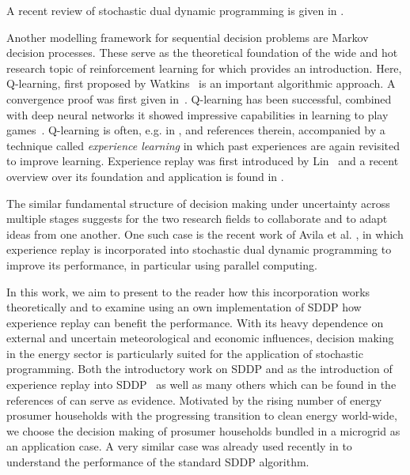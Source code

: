 \documentclass[a4paper,12pt]{article}
\begin{document}
A recent review of stochastic dual dynamic programming is given in \cite{fuellner2021stochastic}.

Another modelling framework for sequential decision problems are Markov decision processes. These serve as the theoretical foundation of the wide and hot research topic of reinforcement learning for which \cite{sutton2018reinforcement} provides an introduction. Here, Q-learning, first proposed by Watkins~\cite{watkins1989learning} is an important algorithmic approach. A convergence proof was first given in~\cite{watkins1992q}. Q-learning has been successful, combined with deep neural networks it showed impressive capabilities in learning to play games~\cite{mnih2013playing}. Q-learning is often, e.g. in \cite{fedus2020revisiting}, \cite{mnih2013playing} and references therein, accompanied by a technique called \emph{experience learning} in which past experiences are again revisited to improve learning. Experience replay was first introduced by Lin~\cite{lin1992self} and a recent overview over its foundation and application is found in \cite{fedus2020revisiting}.

The similar fundamental structure of decision making under uncertainty across multiple stages suggests for the two research fields to collaborate and to adapt ideas from one another. One such case is the recent work of Avila et al. \cite{avila2023batch}, in which experience replay is incorporated into stochastic dual dynamic programming to improve its performance, in particular using parallel computing.

In this work, we aim to present to the reader how this incorporation works theoretically and to examine using an own implementation of SDDP how experience replay can benefit the performance. With its heavy dependence on external and uncertain meteorological and economic influences, decision making in the energy sector is particularly suited for the application of stochastic programming. Both the introductory work on SDDP \cite{pereira1991multi} and as the introduction of experience replay into SDDP~\cite{avila2023batch} as well as many others which can be found in the references of \cite{fuellner2021stochastic} can serve as evidence. Motivated by the rising number of energy prosumer households with the progressing transition to clean energy world-wide, we choose the decision making of prosumer households bundled in a microgrid as an application case. A very similar case was already used recently in \cite{pacaud2022optimization} to understand the performance of the standard SDDP algorithm.
\end{document}
